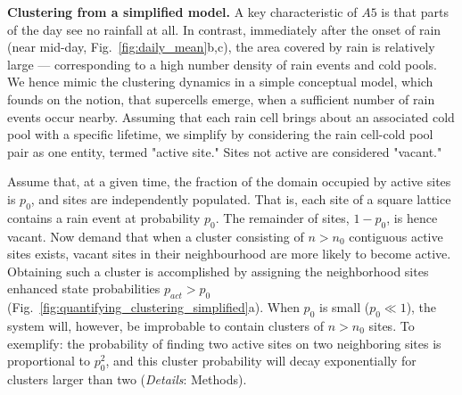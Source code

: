 \documentclass{article}
\begin{document}
\noindent
{\bf Clustering from a simplified model.}
A key characteristic of $A5$ is that parts of the day see no rainfall at all. 
In contrast, immediately after the onset of rain (near mid-day, Fig.~\ref{fig:daily_mean}b,c), the area covered by rain is relatively large --- corresponding to a high number density of rain events and cold pools.
We hence mimic the clustering dynamics in a simple conceptual model, which founds on the notion, that supercells emerge, when a sufficient number of rain events occur nearby. 
Assuming that each rain cell brings about an associated cold pool with a specific lifetime, we simplify by considering the rain cell-cold pool pair as one entity, termed "active site." 
Sites not active are considered "vacant."

Assume that, at a given time, the fraction of the domain occupied by active sites is $p_0$, and sites are independently populated. That is, each site of a square lattice contains a rain event at probability $p_0$.
The remainder of sites, $1-p_0$, is hence vacant.
Now demand that when a cluster consisting of $n>n_0$ contiguous active sites exists, vacant sites in their neighbourhood are more likely to become active. 
Obtaining such a cluster is accomplished by assigning the neighborhood sites enhanced state probabilities $p_{act}>p_0$
(Fig.~\ref{fig:quantifying_clustering_simplified}a).
When $p_0$ is small ($p_0\ll 1$), the system will, however, be improbable to contain clusters of $n>n_0$ sites.
To exemplify: the probability of finding two active sites on two neighboring sites is proportional to $p_0^2$, and this cluster probability will decay exponentially for clusters larger than two ({\it Details}: Methods).
\end{document}
